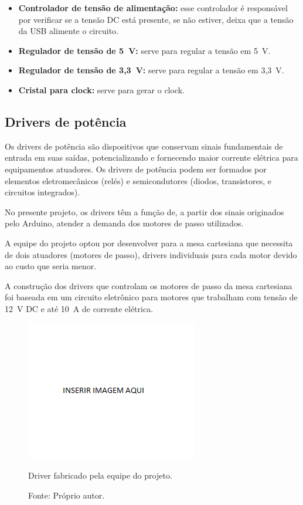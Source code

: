 \begin{itemize}
\item \textbf{Controlador de tensão de alimentação:} esse controlador é responsável por verificar se a tensão DC está presente, se não estiver, deixa que a tensão da \ac{USB} alimente o circuito. 
\item \textbf{Regulador de tensão de 5~V:} serve para regular a tensão em 5~V.
\item \textbf{Regulador de tensão de 3,3~V:} serve para regular a tensão em 3,3~V.
\item \textbf{Cristal para clock:} serve para gerar o clock.
\end{itemize}

\subsection{Drivers de potência}\label{subsec:metdriver}

Os drivers de potência são dispositivos que conservam sinais fundamentais de entrada em suas saídas, 
potencializando e fornecendo maior corrente elétrica para equipamentos atuadores. Os drivers de potência 
podem ser formados por elementos eletromecânicos (relés) e semicondutores (diodos, transistores, e 
circuitos integrados). 

No presente projeto, os drivers têm a função de, a partir dos sinais originados pelo Arduino, atender 
a demanda dos motores de passo utilizados.

A equipe do projeto optou por desenvolver para a mesa cartesiana que necessita de dois atuadores 
(motores de passo), drivers individuais para cada motor devido ao custo que seria menor.

A construção dos drivers que controlam os motores de passo da mesa cartesiana foi baseada em um 
circuito eletrônico para motores que trabalham com tensão de 12~V DC e até 10~A de corrente elétrica. 

\begin{figure}[!htb]
\centering
\includegraphics[scale = 0.2]{figuras/driver}
\caption{Driver fabricado pela equipe do projeto.}
\caption*{Fonte: Próprio autor.}
\label{fig:driver}
\end{figure}
    
